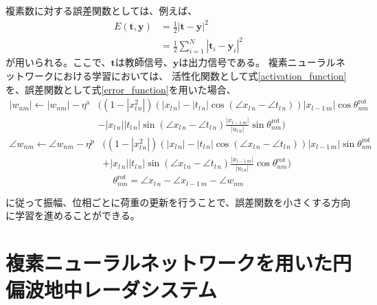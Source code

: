 \documentclass[11pt,a4paper,uplatex]{ujarticle}
\begin{document}
    複素数に対する誤差関数としては、例えば、
    \begin{equation}\label{error_function}
      \begin{split}
      E(\bm{t}, \bm{y})  & = \frac{1}{2}|\bm{t} - \bm{y}|^2\\
      & = \frac{1}{2}\sum_{i=1}^{N}|\bm{t}_i - \bm{y}_i|^2
      \end{split}
    \end{equation}
    が用いられる。ここで、$\bm{t}$は教師信号、$\bm{y}$は出力信号である。
    複素ニューラルネットワークにおける学習においては、
    活性化関数として式\ref{activation_function}を、誤差関数として式\ref{error_function}を用いた場合、
    \begin{equation}
      \label{eq:update_a}
      \begin{split}
        |w_{nm}| \leftarrow |w_{nm}| - \eta^\mathrm{a} & \biggl( (1-|x_{l\,n}^2|)(|x_{l\, n}| - |t_{l\, n}| \cos (\angle x_{l\, n} - \angle t_{l\, n}))|x_{l-1\, m}| \cos \theta^{\mathrm{rot}}_{nm}  \\
                        & - |x_{l\, n}| |t_{l\, n}| \sin (\angle x_{l\, n} - \angle t_{l\, n}) \frac{|x_{l-1\, m}|}{|u_{l\, n}|} \sin \theta^{\mathrm{rot}}_{nm} \biggr)
      \end{split}
    \end{equation}
    \begin{equation}
      \label{eq:update_p}
      \begin{split}
        \angle w_{nm} \leftarrow \angle w_{nm} - \eta^\mathrm{p} & \bigg( (1-|x_{l\,n}^2|)(|x_{l\, n}| - |t_{l\, n}| \cos (\angle x_{l\, n} - \angle t_{l\, n}))|x_{l-1\, m}| \sin \theta^{\mathrm{rot}}_{nm} \\
                        &  + |x_{l\, n}| |t_{l\, n}| \sin (\angle x_{l\, n} - \angle t_{l\, n}) \frac{|x_{l-1\, m}|}{|u_{l\, n}|} \cos \theta^{\mathrm{rot}}_{nm} \bigg)
      \end{split}
    \end{equation}
    \begin{equation}
      \label{eq:rot}
        \theta^{\mathrm{rot}}_{nm} = \angle x_{l\, n} - \angle x_{l-1\, m} -\angle w_{nm}
    \end{equation}

    に従って振幅、位相ごとに荷重の更新を行うことで、誤差関数を小さくする方向に学習を進めることができる。\cite{CVNN}

\section{複素ニューラルネットワークを用いた円偏波地中レーダシステム}
\end{document}
